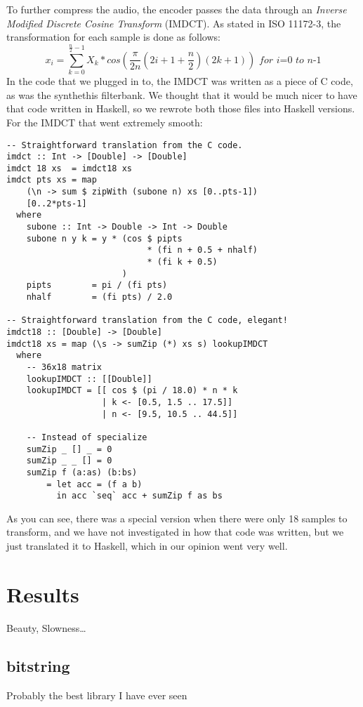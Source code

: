 \documentclass[a4paper,12pt]{article}
\begin{document}
        To further compress the audio, the encoder passes the data through an
        \textit{Inverse Modified Discrete Cosine Transform} (IMDCT). As stated
        in ISO 11172-3, the transformation for each sample is done as follows:
        \[
            x_i = \sum_{k=0}^{\frac{n}{2} - 1}{X_k * cos(\frac{\pi}{2n}(2i + 1 +
                  \frac{n}{2})(2k + 1))}
            \textit{ for i=0 to n-1}
        \]
        In the code that we plugged in to, the IMDCT was written as a piece of C
        code, as was the synthethis filterbank. We thought that it would be much
        nicer to have that code written in Haskell, so we rewrote both those
        files into Haskell versions. For the IMDCT that went extremely smooth:
        \begin{lstlisting}
-- Straightforward translation from the C code.
imdct :: Int -> [Double] -> [Double]
imdct 18 xs  = imdct18 xs
imdct pts xs = map 
    (\n -> sum $ zipWith (subone n) xs [0..pts-1]) 
    [0..2*pts-1]
  where
    subone :: Int -> Double -> Int -> Double
    subone n y k = y * (cos $ pipts 
                            * (fi n + 0.5 + nhalf) 
                            * (fi k + 0.5)
                       )
    pipts        = pi / (fi pts)
    nhalf        = (fi pts) / 2.0

-- Straightforward translation from the C code, elegant!
imdct18 :: [Double] -> [Double]
imdct18 xs = map (\s -> sumZip (*) xs s) lookupIMDCT
  where
    -- 36x18 matrix
    lookupIMDCT :: [[Double]]
    lookupIMDCT = [[ cos $ (pi / 18.0) * n * k
                   | k <- [0.5, 1.5 .. 17.5]] 
                   | n <- [9.5, 10.5 .. 44.5]]
    
    -- Instead of specialize
    sumZip _ [] _ = 0
    sumZip _ _ [] = 0
    sumZip f (a:as) (b:bs) 
        = let acc = (f a b) 
          in acc `seq` acc + sumZip f as bs
        \end{lstlisting}
        As you can see, there was a special version when there were only 18
        samples to transform, and we have not investigated in how that code was
        written, but we just translated it to Haskell, which in our opinion went
        very well. 

\section{Results}
    Beauty, Slowness\ldots
    \subsection{bitstring}
    \label{sec:bitstring}
        Probably the best library I have ever seen
\end{document}
